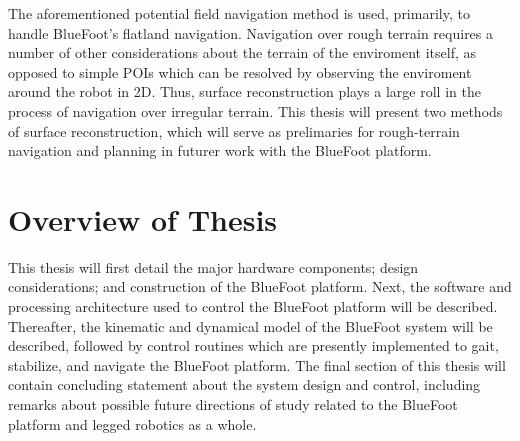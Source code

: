 		The aforementioned potential field navigation method is used, primarily, to handle BlueFoot's flatland navigation. Navigation over rough terrain requires a number of other considerations about the terrain of the enviroment itself, as opposed to simple POIs which can be resolved by observing the enviroment around the robot in 2D. Thus, surface reconstruction plays a large roll in the process of navigation over irregular terrain. This thesis will present two methods of surface reconstruction, which will serve as prelimaries for rough-terrain navigation and planning in futurer work with the BlueFoot platform.

		\section{Overview of Thesis}

		This thesis will first detail the major hardware components; design considerations; and construction of the BlueFoot platform. Next, the software and processing architecture used to control the BlueFoot platform will be described. Thereafter, the kinematic and dynamical model of the BlueFoot system will be described, followed by control routines which are presently implemented to gait, stabilize, and navigate the BlueFoot platform. The final section of this thesis will contain concluding statement about the system design and control, including remarks about possible future directions of study related to the BlueFoot platform and legged robotics as a whole.

